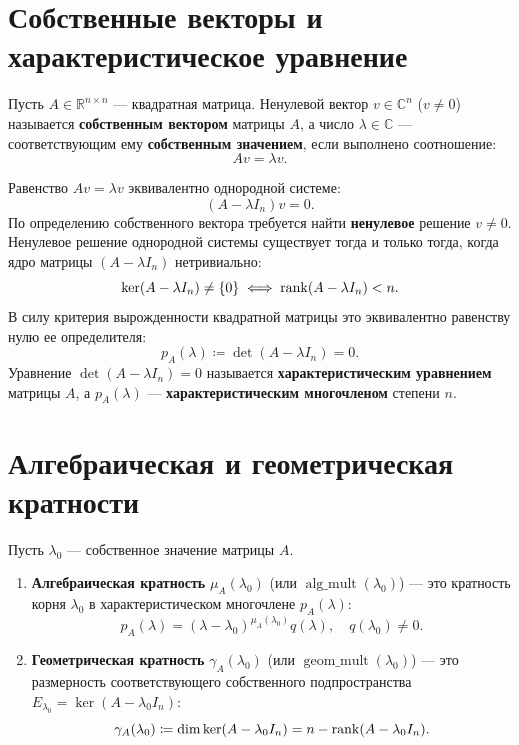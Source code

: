     \section{Собственные векторы и характеристическое уравнение}

    \begin{definition}
Пусть $A \in \mathbb{R}^{n \times n}$ — квадратная матрица.
Ненулевой вектор $v \in \mathbb{C}^n$ ($v \ne 0$) называется \textbf{собственным вектором} матрицы $A$, а число $\lambda
\in \mathbb{C}$ — соответствующим ему \textbf{собственным значением}, если выполнено соотношение:
\[ A v = \lambda v. \]
    \end{definition}

    \begin{theorem}
Равенство $Av = \lambda v$ эквивалентно однородной системе:
\[ (A - \lambda I_n) v = 0. \]
По определению собственного вектора требуется найти \textbf{ненулевое} решение $v \ne 0$.
Ненулевое решение однородной системы существует тогда и только тогда, когда ядро матрицы $(A - \lambda I_n)$
нетривиально:
\[ \ker(A - \lambda I_n) \ne \{0\} \iff \operatorname{rank}(A - \lambda I_n) < n. \]
В силу критерия вырожденности квадратной матрицы это эквивалентно равенству нулю ее определителя:
\[ p_A(\lambda) \coloneqq \det(A - \lambda I_n) = 0. \]
Уравнение $\det(A - \lambda I_n) = 0$ называется \textbf{характеристическим уравнением} матрицы $A$, а $p_A(\lambda)$ —
\textbf{характеристическим многочленом} степени $n$.
    \end{theorem}

    \section{Алгебраическая и геометрическая кратности}

    \begin{definition}
Пусть $\lambda_0$ — собственное значение матрицы $A$.
\begin{enumerate}
    \item \textbf{Алгебраическая кратность} $\mu_A(\lambda_0)$ (или $\operatorname{alg\_mult}(\lambda_0)$) — это
    кратность корня $\lambda_0$ в характеристическом многочлене $p_A(\lambda)$:
    \[ p_A(\lambda) = (\lambda - \lambda_0)^{\mu_A(\lambda_0)} q(\lambda), \quad q(\lambda_0) \ne 0. \]
    \item \textbf{Геометрическая кратность} $\gamma_A(\lambda_0)$ (или $\operatorname{geom\_mult}(\lambda_0)$) — это
    размерность соответствующего собственного подпространства $E_{\lambda_0} = \ker(A - \lambda_0 I_n)$:
    \[ \gamma_A(\lambda_0) \coloneqq \dim \ker(A - \lambda_0 I_n) = n - \operatorname{rank}(A - \lambda_0 I_n). \]
\end{enumerate}
    \end{definition}

